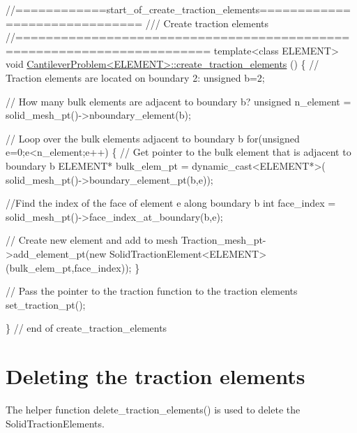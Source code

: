  
\begin{DoxyCodeInclude}
\textcolor{comment}{//============start\_of\_create\_traction\_elements==============================}
\textcolor{comment}{/// Create traction elements }
\textcolor{comment}{}\textcolor{comment}{//=======================================================================}
\textcolor{keyword}{template}<\textcolor{keyword}{class} ELEMENT>
\textcolor{keywordtype}{void} \hyperlink{classCantileverProblem_abb6f19d964d96a531bf1a60732c72ce9}{CantileverProblem<ELEMENT>::create\_traction\_elements}
      ()
\{
 \textcolor{comment}{// Traction elements are located on boundary 2:}
 \textcolor{keywordtype}{unsigned} b=2;

 \textcolor{comment}{// How many bulk elements are adjacent to boundary b?}
 \textcolor{keywordtype}{unsigned} n\_element = solid\_mesh\_pt()->nboundary\_element(b);
 
 \textcolor{comment}{// Loop over the bulk elements adjacent to boundary b}
 \textcolor{keywordflow}{for}(\textcolor{keywordtype}{unsigned} e=0;e<n\_element;e++)
  \{
   \textcolor{comment}{// Get pointer to the bulk element that is adjacent to boundary b}
   ELEMENT* bulk\_elem\_pt = \textcolor{keyword}{dynamic\_cast<}ELEMENT*\textcolor{keyword}{>}(
    solid\_mesh\_pt()->boundary\_element\_pt(b,e));
   
   \textcolor{comment}{//Find the index of the face of element e along boundary b}
   \textcolor{keywordtype}{int} face\_index = solid\_mesh\_pt()->face\_index\_at\_boundary(b,e);
      
   \textcolor{comment}{// Create new element and add to mesh}
   Traction\_mesh\_pt->add\_element\_pt(\textcolor{keyword}{new} SolidTractionElement<ELEMENT>
                                    (bulk\_elem\_pt,face\_index));   
  \}  

 \textcolor{comment}{// Pass the pointer to the traction function to the traction elements}
 set\_traction\_pt();
 
\} \textcolor{comment}{// end of create\_traction\_elements}

\end{DoxyCodeInclude}




 

\hypertarget{index_delete_traction}{}\section{Deleting the traction elements}\label{index_delete_traction}
The helper function {\ttfamily delete\+\_\+traction\+\_\+elements()} is used to delete the {\ttfamily Solid\+Traction\+Elements}.

